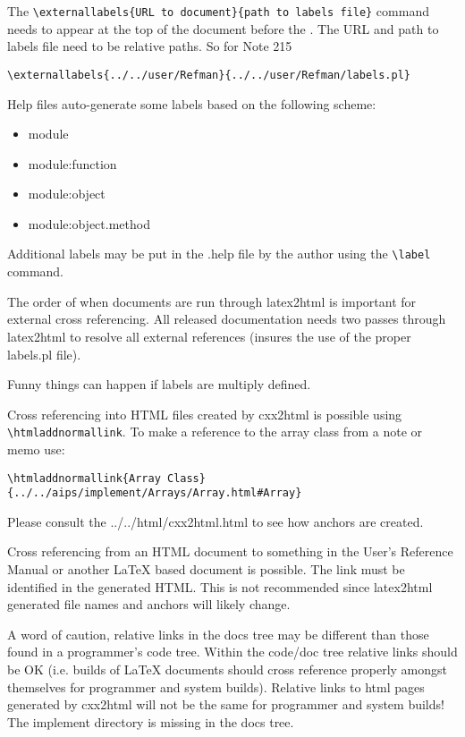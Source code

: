 The \verb!\externallabels{URL to document}{path to labels file}! command
needs to appear at the top of the document before the \verb!!. 
The URL and path to labels file need to be relative paths.  So for Note 215
\begin{verbatim}
\externallabels{../../user/Refman}{../../user/Refman/labels.pl}
\end{verbatim}

Help files auto-generate some labels based on the following scheme:
\begin{itemize}
\item module
\item module:function
\item module:object
\item module:object.method
\end{itemize}
Additional labels may be put in the .help file by the author using the 
\verb!\label! command.

The order of when documents are run through latex2html is important
for external cross referencing. All released 
documentation needs two passes through latex2html to resolve all 
external references (insures the use of the proper labels.pl file).  

Funny things can happen if labels are multiply defined.


Cross referencing into HTML files created by cxx2html is possible using
\verb!\htmladdnormallink!.  To make a reference to the array class from
a note or memo use:
\begin{verbatim}
\htmladdnormallink{Array Class}{../../aips/implement/Arrays/Array.html#Array}
\end{verbatim}

Please consult the 
{../../html/cxx2html.html} to see how anchors are created.

Cross referencing from an HTML document to something in the User's
Reference Manual or another LaTeX based document is possible.
The link must be identified 
in the generated HTML.  This is not recommended since latex2html generated
file names and anchors will likely change.

A word of caution, relative links in the docs tree may be different than those
found in a programmer's code tree.  Within the code/doc tree relative links
should be OK (i.e. builds of LaTeX documents should cross reference properly
amongst themselves for programmer and system builds).  Relative links to html
pages generated by cxx2html will not be the same for programmer and system
builds!  The implement directory is missing in the docs tree.

